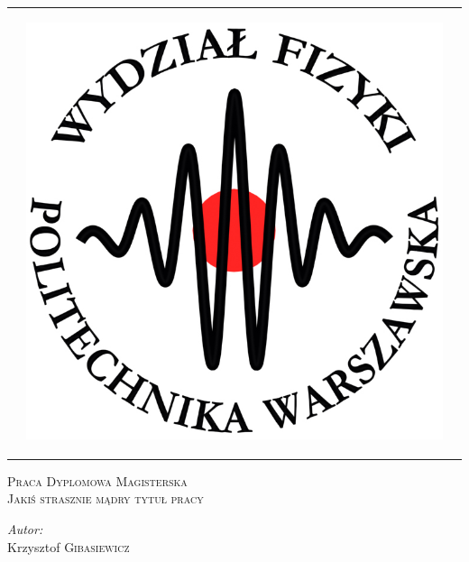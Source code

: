 \begin{titlepage}
\begin{flushleft}
\begin{tabular}{@{} c c c @{}}
		& \begin{minipage}{0.18\textwidth}\begin{center}  \includegraphics[width=\textwidth]{./Strona_tytulowa/obrazki/logofiz}\end{center}\end{minipage}
	\end{tabular}
\end{flushleft}
	
	\begin{center}
		\vspace{0.1\textheight}
		\textsc{\LARGE Praca Dyplomowa Magisterska}\\[0.05\textheight]
		\textsc{\Large Jakiś strasznie mądry tytuł pracy}
		\vspace{0.4\textheight}
	\end{center}

	\begin{flushright}
		\begin{minipage}{0.4\textwidth}
		\begin{flushright}
		\emph{Autor:}\\
		Krzysztof \textsc{Gibasiewicz}
		\end{flushright}
		\end{minipage}
	\end{flushright}


\end{titlepage}

